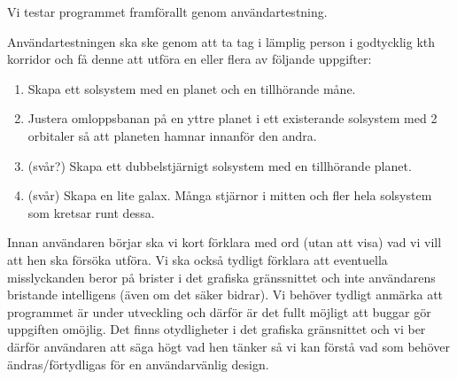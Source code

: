 
Vi testar programmet framförallt genom användartestning.

Användartestningen ska ske genom att ta tag i lämplig person
i godtycklig kth korridor och få denne att utföra en eller flera
av följande uppgifter:
\begin{enumerate}
    \item Skapa ett solsystem med en planet och en tillhörande måne.
    \item Justera omloppsbanan på en yttre planet i ett existerande
        solsystem med 2 orbitaler så att planeten hamnar innanför den andra.
    \item (svår?) Skapa ett dubbelstjärnigt solsystem med en tillhörande planet.
    \item (svår) Skapa en lite galax.
        Många stjärnor i mitten och fler hela solsystem som kretsar runt dessa.
\end{enumerate}

Innan användaren börjar ska vi kort förklara med ord (utan att visa)
vad vi vill att hen ska försöka utföra.
Vi ska också tydligt förklara att eventuella misslyckanden
beror på brister i det grafiska gränssnittet och
inte användarens bristande intelligens (även om det säker bidrar).
Vi behöver tydligt anmärka att programmet är under utveckling och
därför är det fullt möjligt att buggar gör uppgiften omöjlig.
Det finns otydligheter i det grafiska gränsnittet och vi ber därför
användaren att säga högt vad hen tänker så vi kan förstå vad som
behöver ändras/förtydligas för en användarvänlig design.

